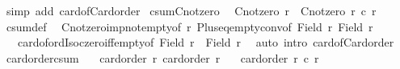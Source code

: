 \begin{isabellebody}
\ {\isacharparenleft}{\kern0pt}simp\ add{\isacharcolon}{\kern0pt}\ card{\isacharunderscore}{\kern0pt}of{\isacharunderscore}{\kern0pt}Card{\isacharunderscore}{\kern0pt}order{\isacharparenright}{\kern0pt}%
\endisatagproof
{\isafoldproof}%
%
\isadelimproof
\isanewline
%
\endisadelimproof
\isanewline
{}\isamarkupfalse%
\ csum{\isacharunderscore}{\kern0pt}Cnotzero{}{\isacharcolon}{\kern0pt}\isanewline
\ \ {\isachardoublequoteopen}Cnotzero\ r{}\ {\isasymLongrightarrow}\ Cnotzero\ {\isacharparenleft}{\kern0pt}r{}\ {\isacharplus}{\kern0pt}c\ r{}{\isacharparenright}{\kern0pt}{\isachardoublequoteclose}\isanewline
%
\isadelimproof
%
\endisadelimproof
%
\isatagproof
{}\isamarkupfalse%
\ csum{\isacharunderscore}{\kern0pt}def\ \isamarkupfalse%
\ Cnotzero{\isacharunderscore}{\kern0pt}imp{\isacharunderscore}{\kern0pt}not{\isacharunderscore}{\kern0pt}empty{\isacharbrackleft}{\kern0pt}of\ r{}{\isacharbrackright}{\kern0pt}\ Plus{\isacharunderscore}{\kern0pt}eq{\isacharunderscore}{\kern0pt}empty{\isacharunderscore}{\kern0pt}conv{\isacharbrackleft}{\kern0pt}of\ {\isachardoublequoteopen}Field\ r{}{\isachardoublequoteclose}\ {\isachardoublequoteopen}Field\ r{}{\isachardoublequoteclose}{\isacharbrackright}{\kern0pt}\isanewline
\ \ \ card{\isacharunderscore}{\kern0pt}of{\isacharunderscore}{\kern0pt}ordIso{\isacharunderscore}{\kern0pt}czero{\isacharunderscore}{\kern0pt}iff{\isacharunderscore}{\kern0pt}empty{\isacharbrackleft}{\kern0pt}of\ {\isachardoublequoteopen}Field\ r{}\ {\isacharless}{\kern0pt}{\isacharplus}{\kern0pt}{\isachargreater}{\kern0pt}\ Field\ r{}{\isachardoublequoteclose}{\isacharbrackright}{\kern0pt}\ \isamarkupfalse%
\ {\isacharparenleft}{\kern0pt}auto\ intro{\isacharcolon}{\kern0pt}\ card{\isacharunderscore}{\kern0pt}of{\isacharunderscore}{\kern0pt}Card{\isacharunderscore}{\kern0pt}order{\isacharparenright}{\kern0pt}%
\endisatagproof
{\isafoldproof}%
%
\isadelimproof
\isanewline
%
\endisadelimproof
\isanewline
{}\isamarkupfalse%
\ card{\isacharunderscore}{\kern0pt}order{\isacharunderscore}{\kern0pt}csum{\isacharcolon}{\kern0pt}\isanewline
\ \ \ {\isachardoublequoteopen}card{\isacharunderscore}{\kern0pt}order\ r{}{\isachardoublequoteclose}\ {\isachardoublequoteopen}card{\isacharunderscore}{\kern0pt}order\ r{}{\isachardoublequoteclose}\isanewline
\ \ \ {\isachardoublequoteopen}card{\isacharunderscore}{\kern0pt}order\ {\isacharparenleft}{\kern0pt}r{}\ {\isacharplus}{\kern0pt}c\ r{}{\isacharparenright}{\kern0pt}{\isachardoublequoteclose}\isanewline

\end{isabellebody}
